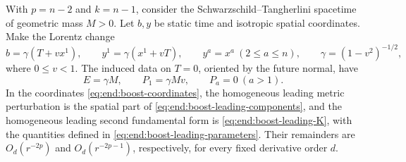\begin{lemma}
\label{lem:end:boost}
With $p=n-2$ and $k=n-1$, consider the Schwarzschild--Tangherlini
spacetime of geometric mass $M>0$.  Let $b,y$ be static time and
isotropic spatial coordinates.  Make the
Lorentz change
\begin{equation}\label{eq:end:boost-coordinates}
 b=\gamma(T+vx^1),\qquad y^1=\gamma(x^1+vT),\qquad
 y^a=x^a\ (2\le a\le n),\qquad \gamma=(1-v^2)^{-1/2},
\end{equation}
where $0\le v<1$.  The induced data on $T=0$, oriented by the
future normal, have
\begin{equation}\label{eq:end:boost-charges}
 E=\gamma M,\qquad P_1=\gamma Mv,\qquad P_a=0\ (a>1).
\end{equation}
In the coordinates \eqref{eq:end:boost-coordinates}, the homogeneous
leading metric perturbation is the spatial part of
\eqref{eq:end:boost-leading-components}, and the homogeneous leading
second fundamental form is \eqref{eq:end:boost-leading-K}, with the
quantities defined in \eqref{eq:end:boost-leading-parameters}.
Their remainders are $O_d(r^{-2p})$ and $O_d(r^{-2p-1})$, respectively,
for every fixed derivative order $d$.
\end{lemma}

